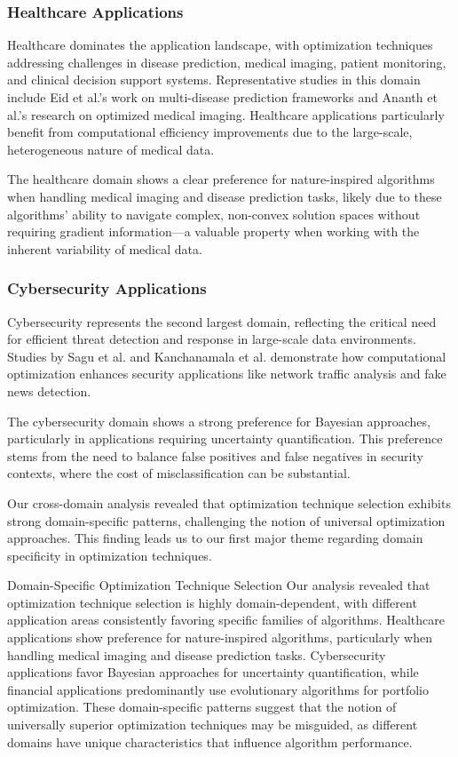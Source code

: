 \subsubsection{Healthcare Applications}
Healthcare dominates the application landscape, with optimization techniques addressing challenges in disease prediction, medical imaging, patient monitoring, and clinical decision support systems. Representative studies in this domain include Eid et al.'s \citep{Eid20223845} work on multi-disease prediction frameworks and Ananth et al.'s \citep{Ananth2022918} research on optimized medical imaging. Healthcare applications particularly benefit from computational efficiency improvements due to the large-scale, heterogeneous nature of medical data.

The healthcare domain shows a clear preference for nature-inspired algorithms when handling medical imaging and disease prediction tasks, likely due to these algorithms' ability to navigate complex, non-convex solution spaces without requiring gradient information—a valuable property when working with the inherent variability of medical data.

\subsubsection{Cybersecurity Applications}
Cybersecurity represents the second largest domain, reflecting the critical need for efficient threat detection and response in large-scale data environments. Studies by Sagu et al. \citep{Sagu202535} and Kanchanamala et al. \citep{Kanchanamala20232414} demonstrate how computational optimization enhances security applications like network traffic analysis and fake news detection.

The cybersecurity domain shows a strong preference for Bayesian approaches, particularly in applications requiring uncertainty quantification. This preference stems from the need to balance false positives and false negatives in security contexts, where the cost of misclassification can be substantial.

Our cross-domain analysis revealed that optimization technique selection exhibits strong domain-specific patterns, challenging the notion of universal optimization approaches. This finding leads us to our first major theme regarding domain specificity in optimization techniques.

\begin{themebox}{Domain-Specific Optimization Technique Selection}
Our analysis revealed that optimization technique selection is highly domain-dependent, with different application areas consistently favoring specific families of algorithms. Healthcare applications show preference for nature-inspired algorithms, particularly when handling medical imaging and disease prediction tasks. Cybersecurity applications favor Bayesian approaches for uncertainty quantification, while financial applications predominantly use evolutionary algorithms for portfolio optimization. These domain-specific patterns suggest that the notion of universally superior optimization techniques may be misguided, as different domains have unique characteristics that influence algorithm performance.
\end{themebox}

